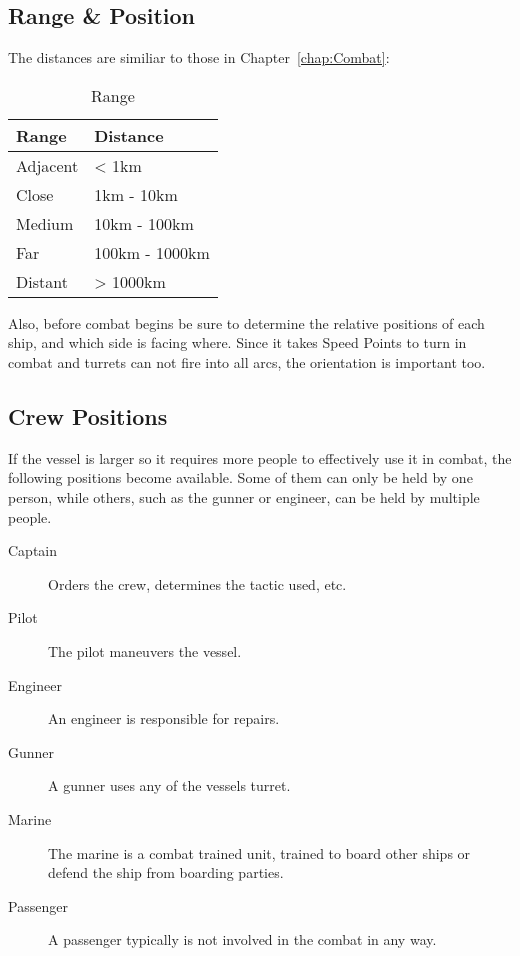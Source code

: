 \subsection{Range \& Position}
\label{sub:Vessels-Combat-Setup-Range}

The distances are similiar to those in Chapter~\ref{chap:Combat}:

\begin{table}[H]
  \centering
  \caption{Range}
  \label{tab:vessel-range}
  \begin{tabular}{|l|l|}
    \hline
    Range    & Distance       \\ \hline
    Adjacent & < 1km          \\ \hline
    Close    & 1km - 10km     \\ \hline
    Medium   & 10km - 100km   \\ \hline
    Far      & 100km - 1000km \\ \hline
    Distant  & > 1000km       \\ \hline
  \end{tabular}
\end{table}


Also, before combat begins be sure to determine the relative positions of each ship, and which side is facing where. Since it takes Speed Points to turn in combat and turrets can not fire into all arcs, the orientation is important too.

\subsection{Crew Positions}
\label{sub:Vessels-Combat-Setup-Crew-Positions}

If the vessel is larger so it requires more people to effectively use it in combat, the following positions become available. Some of them can only be held by one person, while others, such as the gunner or engineer, can be held by multiple people.

\begin{description}
  \item[Captain] Orders the crew, determines the tactic used, etc.
  \item[Pilot] The pilot maneuvers the vessel.
  \item[Engineer] An engineer is responsible for repairs.
  \item[Gunner] A gunner uses any of the vessels turret.
  \item[Marine] The marine is a combat trained unit, trained to board other ships or defend the ship from boarding parties.
  \item[Passenger] A passenger typically is not involved in the combat in any way.
\end{description}

